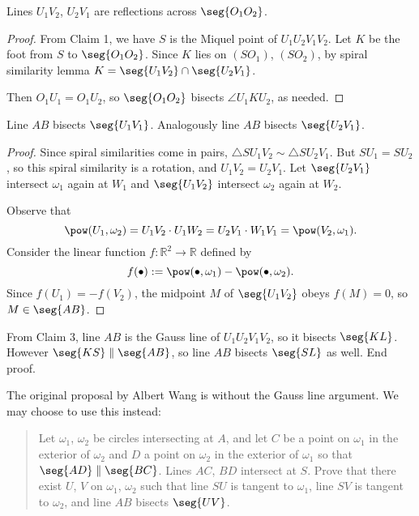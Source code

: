 \begin{claim}
    Lines $U_1V_2$, $U_2V_1$ are reflections across $\seg{O_1O_2}$.
\end{claim}
\begin{proof}
    From Claim 1, we have $S$ is the Miquel point of $U_1U_2V_1V_2$. Let $K$ be the foot from $S$ to $\seg{O_1O_2}$. Since $K$ lies on $(SO_1)$, $(SO_2)$, by spiral similarity lemma $K=\seg{U_1V_2}\cap\seg{U_2V_1}$.

    Then $O_1U_1=O_1U_2$, so $\seg{O_1O_2}$ bisects $\angle U_1KU_2$, as needed.
\end{proof}
\begin{claim}
    Line $AB$ bisects $\seg{U_1V_1}$. Analogously line $AB$ bisects $\seg{U_2V_1}$.
\end{claim}
\begin{proof}
Since spiral similarities come in pairs, $\triangle SU_1V_2\sim\triangle SU_2V_1$. But $SU_1=SU_2$, so this spiral similarity is a rotation, and $U_1V_2=U_2V_1$. Let $\seg{U_2V_1}$ intersect $\omega_1$ again at $W_1$ and $\seg{U_1V_2}$ intersect $\omega_2$ again at $W_2$.

Observe that \[\pow(U_1,\omega_2)=U_1V_2\cdot U_1W_2=U_2V_1\cdot W_1V_1=\pow(V_2,\omega_1).\]
Consider the linear function $f:\mathbb R^2\to\mathbb R$ defined by \[f(\bullet):=\pow(\bullet,\omega_1)-\pow(\bullet,\omega_2).\]
Since $f(U_1)=-f(V_2)$, the midpoint $M$ of $\seg{U_1V_2}$ obeys $f(M)=0$, so $M\in\seg{AB}$.
\end{proof}

From Claim 3, line $AB$ is the Gauss line of $U_1U_2V_1V_2$, so it bisects $\seg{KL}$. However $\seg{KS}\parallel\seg{AB}$, so line $AB$ bisects $\seg{SL}$ as well. End proof.
\begin{remark}
    The original proposal by Albert Wang is without the Gauss line argument. We may choose to use this instead:
    \begin{quote}
    Let $\omega_1$, $\omega_2$ be circles intersecting at $A$, and let $C$ be a point on $\omega_1$ in the exterior of $\omega_2$ and $D$ a point on $\omega_2$ in the exterior of $\omega_1$ so that $\seg{AD}\parallel\seg{BC}$. Lines $AC$, $BD$ intersect at $S$. Prove that there exist $U$, $V$ on $\omega_1$, $\omega_2$ such that line $SU$ is tangent to $\omega_1$, line $SV$ is tangent to $\omega_2$, and line $AB$ bisects $\seg{UV}$.
    \end{quote}
\end{remark}
